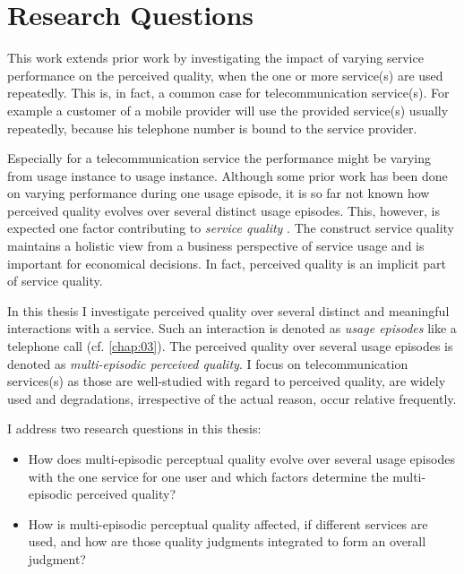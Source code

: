 \section{Research Questions}
This work extends prior work by investigating the impact of varying service performance on the perceived quality, when the one or more service(s) are used repeatedly.
This is, in fact, a common case for telecommunication service(s).
For example a customer of a mobile  provider will use the provided service(s) usually repeatedly, because his telephone number is bound to the service provider.

Especially for a telecommunication service the performance might be varying from usage instance to usage instance.
Although some prior work has been done on varying performance during one usage episode, it is so far not known how perceived quality evolves over several distinct usage episodes.
This, however, is expected one factor contributing to \emph{service quality} \citep[cf.][]{zeithaml_behavioral_1996}.
The construct service quality maintains a holistic view from a business perspective of service usage and is important for economical decisions.
In fact, perceived quality is an implicit part of service quality.

In this thesis I investigate perceived quality over several distinct and meaningful interactions with a service.
Such an interaction is denoted as \emph{usage episodes} like a telephone call (cf. \autoref{chap:03}).
The perceived quality over several usage episodes is denoted as \emph{multi-episodic perceived quality}.
I focus on telecommunication services(s) as those are well-studied with regard to perceived quality, are widely used and degradations, irrespective of the actual reason, occur relative frequently.

I address two research questions in this thesis:
\begin{itemize}
\item How does multi-episodic perceptual quality evolve over several usage episodes with the one service for one user and which factors determine the multi-episodic perceived quality?
\item How is multi-episodic perceptual quality affected, if different services are used, and how are those quality judgments integrated to form an overall judgment?
\end{itemize}

